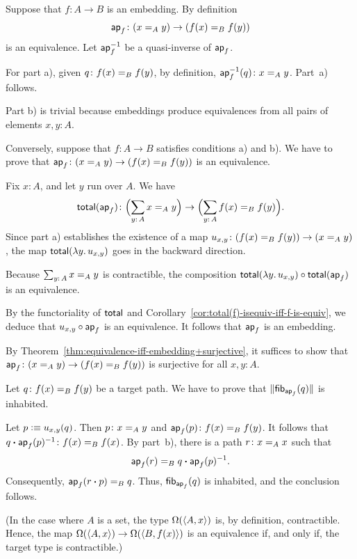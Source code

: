 \begin{solution}
    Suppose that $f\colon A\to B$ is an embedding. By definition 
    \[
        \fun{ap}_f\colon(x\eq Ay)\to(f(x)\eq Bf(y))
    \]
    is an equivalence. Let $\mathsf{ap}_f^{-1}$ be a quasi-inverse of $\mathsf{ap}_f$.
    
    For part a), given $q\colon f(x)\eq Bf(y)$, by definition, $\fun{ap}_f^{-1}(q)\colon x\eq Ay$. Part~a) follows.

    Part b) is trivial because embeddings produce equivalences from all pairs of elements $x,y\colon A$.

    Conversely, suppose that $f\colon A\to B$ satisfies conditions a) and b). We have to prove that $\fun{ap}_f\colon(x\eq Ay)\to(f(x)\eq Bf(y))$ is an equivalence.

    Fix $x\colon A$, and let $y$ run over $A$. We have
    \[
    \fun{total}(\fun{ap}_f)\colon
        \Bigl(\sum_{y\colon A}x\eq Ay\Bigr)
        \to
        \Bigl(\sum_{y\colon A}f(x)\eq Bf(y)\Bigr).
    \]
    Since part a) establishes the existence of a map $u_{x,y}\colon(f(x)\eq Bf(y))\to(x\eq Ay)$, the map $\mathsf{total}(\lambda y.\,u_{x,y})$ goes in the backward direction.
    
    Because $\sum_{y\colon A}x\eq Ay$ is contractible, the composition $\mathsf{total}(\lambda y.\,u_{x,y})\circ\mathsf{total}(\mathsf{ap}_f)$ is an equivalence.

    By the functoriality of $\mathsf{total}$ and Corollary~\ref{cor:total(f)-isequiv-iff-f-is-equiv}, we deduce that $u_{x,y}\circ\mathsf{ap}_f$ is an equivalence. It follows that $\mathsf{ap}_f$ is an embedding.

    By Theorem~\ref{thm:equivalence-iff-embedding+surjective}, it suffices to show that $\fun{ap}_f\colon(x\eq Ay)\to(f(x)\eq Bf(y))$ is surjective for all $x,y\colon A$.

    Let $q\colon f(x)\eq Bf(y)$ be a target path. We have to prove that $\lVert\mathsf{fib}_{\mathsf{ap}_f}(q)\rVert$ is inhabited.
    
    Let $p\mathrel{\vcentcolon}\equiv u_{x,y}(q)$. Then $p\colon x\eq Ay$ and $\fun{ap}_f(p)\colon f(x)\eq Bf(y)$. It follows that $q\ct\fun{ap}_f(p)^{-1}\colon f(x)\eq Bf(x)$. By part~b), there is a path $r\colon x\eq Ax$ such that
    \[
        \mathsf{ap}_f(r)\mathrel{=_{B}}q\mathbin{\boldsymbol{\cdot}}\mathsf{ap}_f(p)^{-1}.
    \]
    Consequently, $\mathsf{ap}_f(r\mathbin{\boldsymbol{\cdot}} p)\mathrel{=_{B}}q$. Thus, $\mathsf{fib}_{\mathsf{ap}_f}(q)$ is inhabited, and the conclusion follows.

    (In the case where $A$ is a set, the type $\Omega(\langle A,x\rangle)$ is, by definition, contractible. Hence, the map $\Omega(\langle A,x\rangle)\to\Omega(\langle B,f(x)\rangle)$ is an equivalence if, and only if, the target type is contractible.)


\end{solution}
